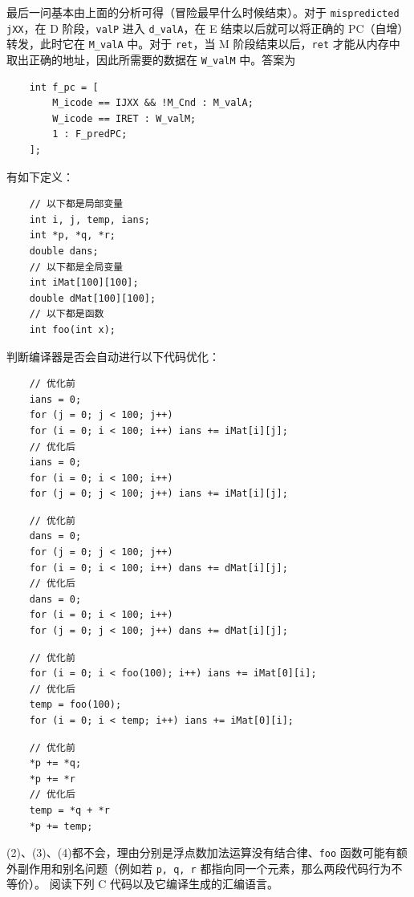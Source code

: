 \begin{problems}
        最后一问基本由上面的分析可得（冒险最早什么时候结束）。对于 \verb|mispredicted jXX|，在 D 阶段，\verb|valP| 进入 \verb|d_valA|，在 E 结束以后就可以将正确的 PC（自增）转发，此时它在 \verb|M_valA| 中。对于 \verb|ret|，当 M 阶段结束以后，\verb|ret| 才能从内存中取出正确的地址，因此所需要的数据在 \verb|W_valM| 中。答案为
        \begin{verbatim}
    int f_pc = [
        M_icode == IJXX && !M_Cnd : M_valA;
        W_icode == IRET : W_valM;
        1 : F_predPC;
    ];
        \end{verbatim}
        \pro 有如下定义：
        \begin{verbatim}
    // 以下都是局部变量
    int i, j, temp, ians;
    int *p, *q, *r;
    double dans;
    // 以下都是全局变量
    int iMat[100][100];
    double dMat[100][100];
    // 以下都是函数
    int foo(int x);
        \end{verbatim}
        判断编译器是否会自动进行以下代码优化：
        \qn
        \begin{verbatim}
    // 优化前
    ians = 0;
    for (j = 0; j < 100; j++)
    for (i = 0; i < 100; i++) ians += iMat[i][j];
    // 优化后
    ians = 0;
    for (i = 0; i < 100; i++)
    for (j = 0; j < 100; j++) ians += iMat[i][j];
        \end{verbatim}
        \qn
        \begin{verbatim}
    // 优化前
    dans = 0;
    for (j = 0; j < 100; j++)
    for (i = 0; i < 100; i++) dans += dMat[i][j];
    // 优化后
    dans = 0;
    for (i = 0; i < 100; i++)
    for (j = 0; j < 100; j++) dans += dMat[i][j];
        \end{verbatim}
        \qn
        \begin{verbatim}
    // 优化前
    for (i = 0; i < foo(100); i++) ians += iMat[0][i];
    // 优化后
    temp = foo(100);
    for (i = 0; i < temp; i++) ians += iMat[0][i];
        \end{verbatim}
        \qn
        \begin{verbatim}
    // 优化前
    *p += *q;
    *p += *r
    // 优化后
    temp = *q + *r
    *p += temp;
        \end{verbatim}
        \sol (2)、(3)、(4)都不会，理由分别是浮点数加法运算没有结合律、\verb|foo| 函数可能有额外副作用和别名问题（例如若 \verb|p, q, r| 都指向同一个元素，那么两段代码行为不等价）。
        \pro 阅读下列 C 代码以及它编译生成的汇编语言。

\end{problems}
